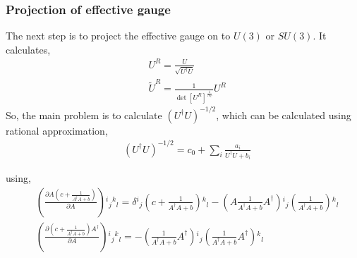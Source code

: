 \subsubsection{\label{sec:projection_of_effective_gauge}Projection of effective gauge}

The next step is to project the effective gauge on to $U(3)$ or $SU(3)$.
It calculates,
\begin{equation}
\begin{split}
&U^R = \frac{U}{\sqrt{U^{\dagger}U}}\\
&\tilde{U}^R=\frac{1}{\det [U^R]^{\frac{1}{N_C}}}U^R
\end{split}
\end{equation}
So, the main problem is to calculate $\left(U^{\dagger}U\right)^{-1/2}$, which can be calculated using rational approximation,
\begin{equation}
\begin{split}
&\left(U^{\dagger}U\right)^{-1/2}=c_0+\sum _i \frac{a_i}{U^{\dagger}U+b_i}
\end{split}
\end{equation}

using,
\textcolor[rgb]{0,0,1}{
\begin{equation}
\begin{split}
&\left(\frac{\partial A\left(c+\frac{1}{A^{\dagger}A+b}\right)}{\partial A}\right){}^i{}_j{}^k{}_l= \delta {}^i{}_j  \left(c+\frac{1}{A^{\dagger}A+b}\right){}^k{}_l-\left(A\frac{1}{A^{\dagger}A+b}A^{\dagger}\right){}^i{}_j  \left(\frac{1}{A^{\dagger}A+b}\right){}^k{}_l\\
&\left(\frac{\partial \left(c+\frac{1}{A^{\dagger}A+b}\right)A^{\dagger}}{\partial A}\right){}^i{}_j{}^k{}_l=-\left(\frac{1}{A^{\dagger}A+b}A^{\dagger}\right){}^i{}_j  \left(\frac{1}{A^{\dagger}A+b}A^{\dagger}\right){}^k{}_l\\
\end{split}
\end{equation}
}

